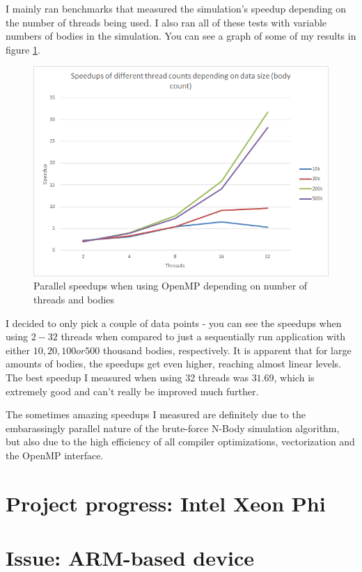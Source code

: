 \documentclass[journal]{IEEEtran}
\begin{document}
			I mainly ran benchmarks that measured the simulation's speedup depending on the number of threads being used. I also ran all of these tests with variable numbers of bodies in the simulation. You can see a graph of some of my results in figure \ref{parspeedup}. 
			
			\begin{figure}[ht]			
				\centering
				\includegraphics[width=.45\textwidth]{parspeedup.png}
				\caption{\label{parspeedup}Parallel speedups when using OpenMP depending on number of threads and bodies}
			\end{figure} 
			
			I decided to only pick a couple of data points - you can see the speedups when using $2-32$ threads when compared to just a sequentially run application with either $10, 20, 100 or 500$ thousand bodies, respectively. It is apparent that for large amounts of bodies, the speedups get even higher, reaching almost linear levels. The best speedup I measured when using 32 threads was $31.69$, which is extremely good and can't really be improved much further.
			
			The sometimes amazing speedups I measured are definitely due to the embarassingly parallel nature of the brute-force N-Body simulation algorithm, but also due to the high efficiency of all compiler optimizations, vectorization and the OpenMP interface.
			
		\section{Project progress: Intel Xeon Phi}
			
		\section{Issue: ARM-based device}
		
		
	
\end{document}
